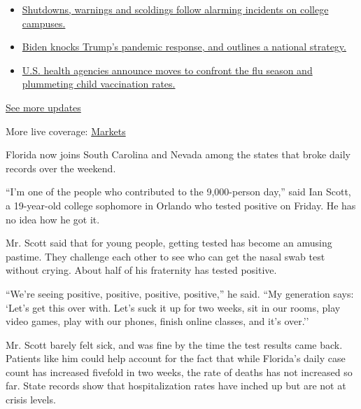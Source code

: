 \begin{itemize}
\tightlist
\item
  \href{https://www.nytimes3xbfgragh.onion/2020/08/20/world/coronavirus-covid.html?action=click\&pgtype=Article\&state=default\&region=MAIN_CONTENT_1\&context=storylines_live_updates\#link-68774d88}{Shutdowns,
  warnings and scoldings follow alarming incidents on college campuses.}
\item
  \href{https://www.nytimes3xbfgragh.onion/2020/08/20/world/coronavirus-covid.html?action=click\&pgtype=Article\&state=default\&region=MAIN_CONTENT_1\&context=storylines_live_updates\#link-26b58724}{Biden
  knocks Trump's pandemic response, and outlines a national strategy.}
\item
  \href{https://www.nytimes3xbfgragh.onion/2020/08/20/world/coronavirus-covid.html?action=click\&pgtype=Article\&state=default\&region=MAIN_CONTENT_1\&context=storylines_live_updates\#link-4e542da3}{U.S.
  health agencies announce moves to confront the flu season and
  plummeting child vaccination rates.}
\end{itemize}

\href{https://www.nytimes3xbfgragh.onion/2020/08/20/world/coronavirus-covid.html?action=click\&pgtype=Article\&state=default\&region=MAIN_CONTENT_1\&context=storylines_live_updates}{See
more updates}

More live coverage:
\href{https://www.nytimes3xbfgragh.onion/live/2020/08/20/business/stock-market-today-coronavirus?action=click\&pgtype=Article\&state=default\&region=MAIN_CONTENT_1\&context=storylines_live_updates}{Markets}

Florida now joins South Carolina and Nevada among the states that broke
daily records over the weekend.

``I'm one of the people who contributed to the 9,000-person day,'' said
Ian Scott, a 19-year-old college sophomore in Orlando who tested
positive on Friday. He has no idea how he got it.

Mr. Scott said that for young people, getting tested has become an
amusing pastime. They challenge each other to see who can get the nasal
swab test without crying. About half of his fraternity has tested
positive.

``We're seeing positive, positive, positive, positive,'' he said. ``My
generation says: `Let's get this over with. Let's suck it up for two
weeks, sit in our rooms, play video games, play with our phones, finish
online classes, and it's over.''

Mr. Scott barely felt sick, and was fine by the time the test results
came back. Patients like him could help account for the fact that while
Florida's daily case count has increased fivefold in two weeks, the rate
of deaths has not increased so far. State records show that
hospitalization rates have inched up but are not at crisis levels.

